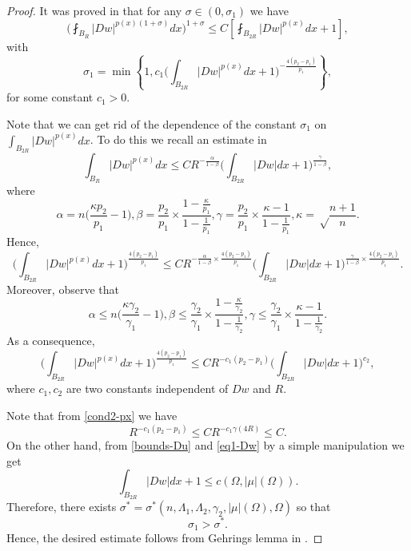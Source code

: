 \documentclass[a4paper,10pt]{amsart}
\newcommand{\f}{\frac}
\newcommand{\Om}{\Omega}
\begin{document}
\begin{proof}
It was proved in \cite[Theorem 5]{AM2} that for any $\sigma\in (0,\sigma_1)$ we have
$$
\Big(\fint_{B_R}|Dw|^{p(x)(1+\sigma)}dx\Big)^{1+\sigma}\leq C\left[\fint_{B_{2R}}|Dw|^{p(x)}dx +1\right],
$$
with 
$$
\sigma_1=\min\left\{1, c_1\Big(\int_{B_{2R}}|Dw|^{p(x)}dx +1\Big)^{-\f{4(p_2-p_1)}{p_1}}\right\},
$$	
for some constant $c_1>0$.

Note that we can get rid of the dependence of the constant $\sigma_1$ on $\int_{B_{2R}}|Dw|^{p(x)}dx$. To do this we recall an estimate in \cite[p. 654]{BH}
$$
\int_{B_R}|Dw|^{p(x)}dx\leq CR^{-\f{\alpha}{1-\beta}} \Big(\int_{B_{2R}}|Dw|dx +1\Big)^{\f{\gamma}{1-\beta}}, 
$$
where 
$$
\alpha=n\Big(\f{\kappa p_2}{p_1}-1\Big), \beta=\f{p_2}{p_1}\times \f{1-\f{\kappa}{p_1}}{1-\f{1}{p_1}}, \gamma=\f{p_2}{p_1}\times \f{\kappa -1}{1-\f{1}{p_1}}, \kappa=\sqrt \f{n+1}{n}.
$$
Hence,
$$
\Big(\int_{B_{2R}}|Dw|^{p(x)}dx +1\Big)^{\f{4(p_2-p_1)}{p_1}}\leq CR^{-\f{\alpha}{1-\beta}\times \f{4(p_2-p_1)}{p_1}} \Big(\int_{B_{2R}}|Dw|dx +1\Big)^{\f{\gamma}{1-\beta}\times \f{4(p_2-p_1)}{p_1}}.
$$
Moreover, observe that  
$$
\alpha\leq n\Big(\f{\kappa \gamma_2}{\gamma_1}-1\Big), \beta\leq \f{\gamma_2}{\gamma_1}\times \f{1-\f{\kappa}{\gamma_2}}{1-\f{1}{\gamma_2}}, \gamma\leq \f{\gamma_2}{\gamma_1}\times \f{\kappa -1}{1-\f{1}{\gamma_2}}.
$$
As a consequence,
$$
\Big(\int_{B_{2R}}|Dw|^{p(x)}dx +1\Big)^{\f{4(p_2-p_1)}{p_1}}\leq CR^{-c_1(p_2-p_1)} \Big(\int_{B_{2R}}|Dw|dx +1\Big)^{c_2},
$$
where $c_1, c_2$ are two constants independent of $Dw$ and $R$.

Note that from \eqref{cond2-px} we have
$$
R^{-c_1(p_2-p_1)}\leq CR^{-c_1\gamma(4R)}\leq C.
$$
On the other hand, from \eqref{bounds-Du} and \eqref{eq1-Dw} by a simple manipulation we get
$$
\int_{B_{2R}}|Dw|dx +1\leq c(\Om, |\mu|(\Om)).
$$
Therefore, there exists $\sigma^*=\sigma^*(n,\Lambda_1, \Lambda_2, \gamma_2, |\mu|(\Om), \Om)$ so that 
$$
\sigma_1>\sigma^*.
$$ 
Hence, the desired estimate follows from  Gehrings lemma in \cite[Theorem 6.7]{Giu}.
\end{proof}
\end{document}
